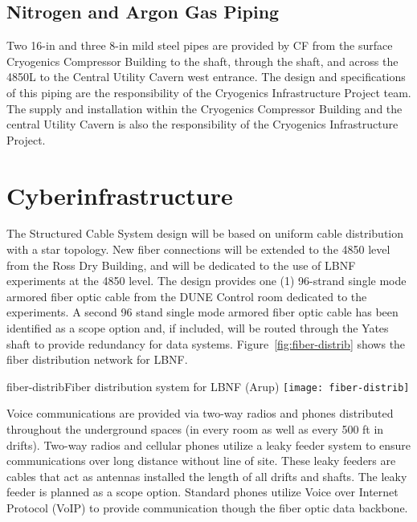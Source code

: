 \subsection{Nitrogen and Argon Gas Piping}
\label{sec:fscf-und-gas-piping}

Two 16-in and three 8-in mild steel pipes are provided by CF from the surface Cryogenics Compressor Building to the shaft, through the shaft, and across the 4850L to the Central Utility Cavern west entrance. The design and specifications of this piping are the responsibility of the Cryogenics Infrastructure Project team. The supply and installation within the Cryogenics Compressor Building and the central Utility Cavern is also the responsibility of the Cryogenics Infrastructure Project.


\section{Cyberinfrastructure}
\label{sec:fscf-und-cyber}

The Structured Cable System design will be based on uniform cable distribution with a star topology. New fiber connections will be extended to the 4850 level from the Ross Dry Building, and will be dedicated to the use of LBNF experiments at the 4850 level. The design provides one (1) 96-strand single mode armored fiber optic cable from the DUNE Control room dedicated to the experiments. A second 96 stand single mode armored fiber optic cable has been identified as a scope option and, if included, will be routed through the Yates shaft to provide redundancy for data systems.  Figure~\ref{fig:fiber-distrib} shows the fiber distribution network for LBNF.

\begin{cdrfigure}{fiber-distrib}{Fiber distribution system for LBNF (Arup)}
\texttt{[image: fiber-distrib]}
\end{cdrfigure}

Voice communications are provided via two-way radios and phones distributed throughout the underground spaces (in every room as well as every 500 ft in drifts). Two-way radios and cellular phones utilize a leaky feeder system to ensure communications over long distance without line of site. These leaky feeders are cables that act as antennas installed the length of all drifts and shafts. The leaky feeder is planned as a scope option.  Standard phones utilize Voice over Internet Protocol (VoIP) to provide communication though the fiber optic data backbone.

